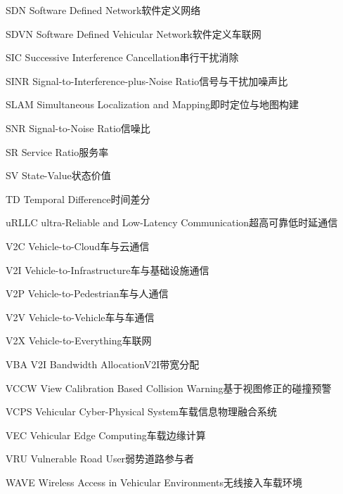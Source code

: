 \begin{abbreviate}[0mm][18mm]
\item[SDN] Software Defined Network\hspace{1em}软件定义网络
\item[SDVN] Software Defined Vehicular Network\hspace{1em}软件定义车联网
\item[SIC] Successive Interference Cancellation\hspace{1em}串行干扰消除
\item[SINR] Signal-to-Interference-plus-Noise Ratio\hspace{1em}信号与干扰加噪声比
\item[SLAM] Simultaneous Localization and Mapping\hspace{1em}即时定位与地图构建
\item[SNR] Signal-to-Noise Ratio\hspace{1em}信噪比
\item[SR] Service Ratio\hspace{1em}服务率
\item[SV] State-Value\hspace{1em}状态价值
\item[TD] Temporal Difference\hspace{1em}时间差分
\item[uRLLC] ultra-Reliable and Low-Latency Communication\hspace{1em}超高可靠低时延通信
\item[V2C] Vehicle-to-Cloud\hspace{1em}车与云通信
\item[V2I] Vehicle-to-Infrastructure\hspace{1em}车与基础设施通信
\item[V2P] Vehicle-to-Pedestrian\hspace{1em}车与人通信
\item[V2V] Vehicle-to-Vehicle\hspace{1em}车与车通信
\item[V2X] Vehicle-to-Everything\hspace{1em}车联网
\item[VBA] V2I Bandwidth Allocation\hspace{1em}V2I带宽分配
\item[VCCW] View Calibration Based Collision Warning\hspace{1em}基于视图修正的碰撞预警
\item[VCPS] Vehicular Cyber-Physical System\hspace{1em}车载信息物理融合系统
\item[VEC] Vehicular Edge Computing\hspace{1em}车载边缘计算
\item[VRU] Vulnerable Road User\hspace{1em}弱势道路参与者
\item[WAVE] Wireless Access in Vehicular Environments\hspace{1em}无线接入车载环境
\end{abbreviate}
\endinput